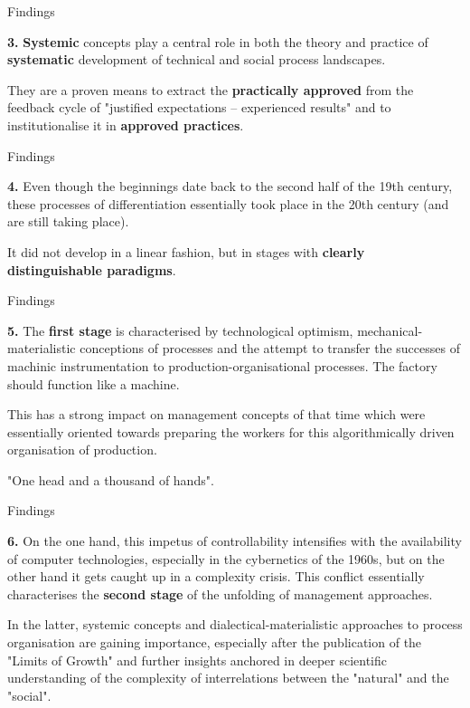 \documentclass{beamer}
\begin{document}
\begin{frame}{Findings}

\textbf{3.}
\textbf{Systemic} concepts play a central role in both the theory and practice
of \textbf{systematic} development of technical and social process landscapes.

They are a proven means to extract the \textbf{practically approved} from the
feedback cycle of "justified expectations -- experienced results" and to
institutionalise it in \textbf{approved practices}.
\end{frame}
\begin{frame}{Findings}

\textbf{4.}
Even though the beginnings date back to the second half of the 19th century,
these processes of differentiation essentially took place in the 20th century
(and are still taking place).

It did not develop in a linear fashion, but in stages with \textbf{clearly
  distinguishable paradigms}.
\end{frame}
\begin{frame}{Findings}

\textbf{5.}
The \textbf{first stage} is characterised by technological optimism,
mechanical-materialistic conceptions of processes and the attempt to transfer
the successes of machinic instrumentation to production-organisational
processes.  The factory should function like a machine.

This has a strong impact on management concepts of that time which were
essentially oriented towards preparing the workers for this algorithmically
driven organisation of production.

"One head and a thousand of hands".
\end{frame}
\begin{frame}{Findings}

\textbf{6.}  On the one hand, this impetus of controllability intensifies with
the availability of computer technologies, especially in the cybernetics of
the 1960s, but on the other hand it gets caught up in a complexity crisis.
This conflict essentially characterises the \textbf{second stage} of the
unfolding of management approaches.

In the latter, systemic concepts and dialectical-materialistic approaches to
process organisation are gaining importance, especially after the publication
of the "Limits of Growth" and further insights anchored in deeper scientific
understanding of the complexity of interrelations between the "natural" and
the "social".
\end{frame}
\end{document}
